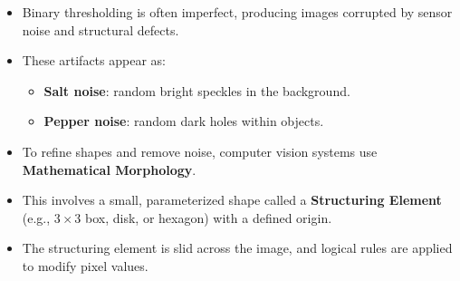 \documentclass[12pt]{article}
\begin{document}
\begin{itemize}
    \item Binary thresholding is often imperfect, producing images corrupted by sensor noise and structural defects.

    \item These artifacts appear as:
          \begin{itemize}
              \item \textbf{Salt noise}: random bright speckles in the background.
              \item \textbf{Pepper noise}: random dark holes within objects.
          \end{itemize}

    \item To refine shapes and remove noise, computer vision systems use \textbf{Mathematical Morphology}.

    \item This involves a small, parameterized shape called a \textbf{Structuring Element} (e.g., $3 \times 3$ box, disk, or hexagon) with a defined origin.

    \item The structuring element is slid across the image, and logical rules are applied to modify pixel values.
\end{itemize}
\end{document}
